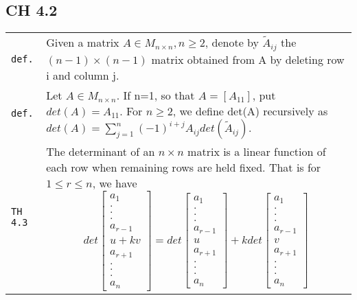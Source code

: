 \documentclass[10pt,landscape]{article}
\begin{document}
\begin{multicols}{3}
\section{CH 4.2}
\begin{tabular}{@{}p{\the\MyLen}%
                @{}p{\linewidth-\the\MyLen}@{}} %
\verb!def.! & Given a matrix $A\in M_{n\!\times\! n}, n\geq 2$, denote by $\tilde{A}_{ij}$ the $(n-1)\!\times\! (n-1)$ matrix obtained from A by deleting row i and column j.\\
\verb!def.! & Let $A\in M_{n\!\times\! n}$. If n=1, so that $A=[A_{11}]$, put $det(A)=A_{11}$.  For $n\geq 2$, we define det(A) recursively as $det(A) = \sum_{j=1}^n (-1)^{i+j} A_{ij} 
             det(\tilde{A}_{ij})$.\\
\verb!TH 4.3! & The determinant of an $n\!\times\! n$ matrix is a linear function of each row when remaining rows are held fixed. That is for $1\leq r\leq n$, we have
               \begin{equation*}
               det\begin{bmatrix} a_1 \\ . \\ . \\ . \\ a_{r-1} \\ u + kv \\ a_{r+1} \\ . \\ . \\ . \\ a_n \end{bmatrix} =
               det\begin{bmatrix} a_1 \\ . \\ . \\ . \\ a_{r-1} \\ u \\ a_{r+1} \\ . \\ . \\ . \\ a_n \end{bmatrix} +
               kdet\begin{bmatrix} a_1 \\ . \\ . \\ . \\ a_{r-1} \\ v \\ a_{r+1} \\ . \\ . \\ . \\ a_n \end{bmatrix}

\end{equation*}
\end{tabular}
\end{multicols}
\end{document}
